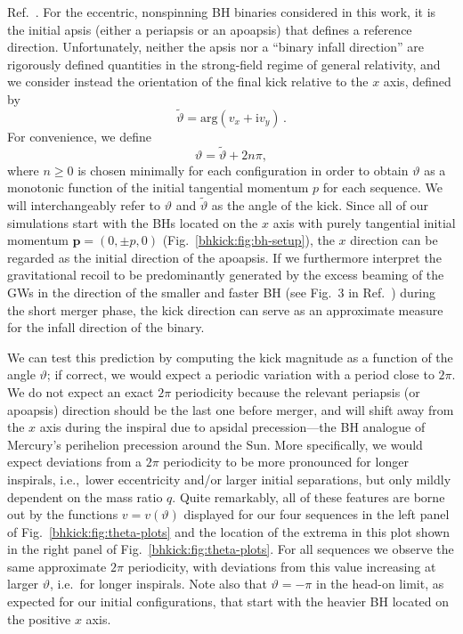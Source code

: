 Ref.~\cite{Sperhake:2019wwo}. For the eccentric, nonspinning BH
binaries considered in this work, it is the
initial apsis (either a periapsis or an apoapsis)
that defines a reference direction. Unfortunately,
neither the apsis nor a ``binary infall direction''
are rigorously defined
quantities in the strong-field regime of general relativity,
and we consider instead the orientation of the final
kick relative to the $x$ axis, defined by
%
\begin{equation}
  \tilde{\vartheta} = \mathrm{arg}(v_x + \mathrm{i}v_y)\,.
\end{equation}
For convenience, we define
\begin{equation}
    \vartheta = \tilde{\vartheta} + 2n\pi,
\end{equation}
where $n\geq 0$ is chosen minimally for each configuration in order to obtain
$\vartheta$ as a monotonic function of the initial tangential momentum $p$
for each sequence. We will interchangeably refer to $\vartheta$
and $\tilde{\vartheta}$ as the angle of the kick.
%
Since all of our simulations start with the BHs located on the $x$
axis with purely tangential initial momentum $\mathbf{p}=(0,\pm p,0)$
(Fig.~\ref{bhkick:fig:bh-setup}), the $x$ direction can be regarded as the
initial direction of the apoapsis. If we furthermore interpret the
gravitational recoil to be predominantly generated by the excess
beaming of the GWs in the direction of the smaller and faster BH (see
Fig.~3 in Ref.~\cite{Wiseman:1992dv}) during the short merger phase,
the kick direction can serve as an approximate measure for the infall
direction of the binary.

We can test this prediction by computing the kick magnitude
as a function of the angle $\vartheta$; if correct, we would
expect a periodic variation with a period close to $2\pi$.
We do not expect an exact $2\pi$ periodicity because the
relevant periapsis (or apoapsis) direction should be the last one before merger,
and will shift away from the $x$ axis during the inspiral
due to
apsidal precession---the BH analogue
of Mercury's perihelion precession around the Sun. More
specifically, we would expect deviations from a $2\pi$ periodicity
to be more pronounced for longer inspirals, i.e.,~lower eccentricity
and/or larger initial separations, but only mildly
dependent on the mass ratio $q$.
Quite remarkably, all of these
features are borne out by the functions $v = v(\vartheta)$
displayed for our four sequences in the left panel of
Fig.~\ref{bhkick:fig:theta-plots}
and the location of the extrema in this plot shown in
the right panel of Fig.~\ref{bhkick:fig:theta-plots}.
For all sequences we observe the same approximate $2\pi$ periodicity,
with deviations from this value increasing at larger
$\vartheta$, i.e.~for longer inspirals.
Note also that $\vartheta=-\pi$ in the head-on limit, as expected
for our initial configurations, that start with the heavier BH
located on the positive $x$ axis.

